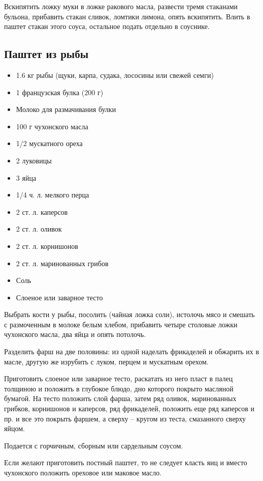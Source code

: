 Вскипятить ложку муки в ложке ракового масла, развести тремя стаканами бульона, прибавить стакан сливок, ломтики лимона, опять вскипятить. Влить в паштет стакан этого соуса, остальное подать отдельно в соуснике.

\subsection{Паштет из рыбы}

\begin{itemize}
	\item 1.6 кг рыбы (щуки, карпа, судака, лососины или свежей семги) 
    \item 1 французская булка (200 г) 
    \item Молоко для размачивания булки 
    \item 100 г чухонского масла 
    \item 1/2 мускатного ореха 
    \item 2 луковицы 
    \item 3 яйца 
    \item 1/4 ч. л. мелкого перца 
    \item 2 ст. л. каперсов 
    \item 2 ст. л. оливок
    \item 2 ст. л. корнишонов
    \item 2 ст. л. маринованных грибов
    \item Соль 
    \item Слоеное или заварное тесто
\end{itemize}

Выбрать кости у рыбы, посолить (чайная ложка соли), истолочь мясо и смешать с размоченным в молоке белым хлебом, прибавить четыре столовые ложки чухонского масла, два яйца и опять потолочь.

Разделить фарш на две половины: из одной наделать фрикаделей и обжарить их в масле, другую же изрубить с луком, перцем и мускатным орехом.

Приготовить слоеное или заварное тесто, раскатать из него пласт в палец толщиною и положить в глубокое блюдо, дно которого покрыто масляной бумагой. На тесто положить слой фарша, затем ряд оливок, маринованных грибков, корнишонов и каперсов, ряд фрикаделей, положить еще ряд каперсов и пр. и все это покрыть фаршем, а сверху – кругом из теста, смазанного сверху яйцом.

Подается с горчичным, сборным или сардельным соусом.

Если желают приготовить постный паштет, то не следует класть яиц и вместо чухонского положить ореховое или маковое масло.

